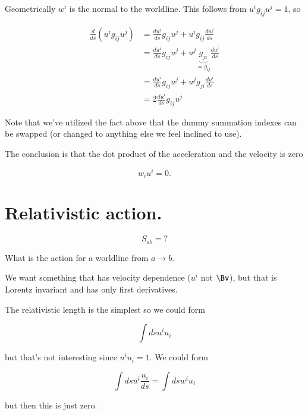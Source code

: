 Geometrically $w^i$ is the normal to the worldline.  This follows from $u^i g_{ij} u^j = 1$, so

\begin{align*}
\frac{d}{ds} \left( u^i g_{ij} u^j \right) 
&=
\frac{d u^i}{ds} g_{ij} u^j 
+u^i g_{ij} \frac{d u^j}{ds} \\
&=
\frac{d u^i}{ds} g_{ij} u^j 
+u^j \underbrace{g_{ji}}_{= g_{ij}} \frac{d u^i}{ds} \\
&=
\frac{d u^i}{ds} g_{ij} u^j 
+u^j g_{ji} \frac{d u^i}{ds} \\
&=
2 \frac{d u^i}{ds} g_{ij} u^j 
\end{align*}

Note that we've utilized the fact above that the dummy summation indexes can be swapped (or changed to anything else we feel inclined to use).

The conclusion is that the dot product of the acceleration and the velocity is zero

\begin{equation}\label{eqn:relativisticElectrodynamicsL7:130}
w_i u^i = 0.
\end{equation}

\section{Relativistic action.}

\begin{equation}\label{eqn:relativisticElectrodynamicsL7:140}
S_{ab} = ?
\end{equation}

What is the action for a worldline from $a \rightarrow b$.

We want something that has velocity dependence ($u^i$ not $\Bv$), but that is Lorentz invariant and has only first derivatives.

The relativistic length is the simplest so we could form

\begin{equation}\label{eqn:relativisticElectrodynamicsL7:150}
\int ds u^i u_i
\end{equation}

but that's not interesting since $u^i u_i = 1$.  We could form

\begin{equation}\label{eqn:relativisticElectrodynamicsL7:160}
\int ds u^i \frac{u_i}{ds} = \int ds w^i u_i
\end{equation}

but then this is just zero.

